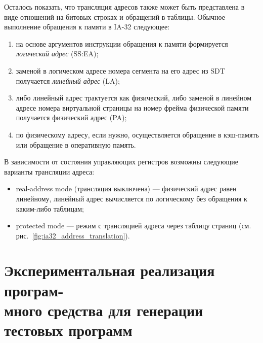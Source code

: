 Осталось показать, что трансляция адресов также может быть представлена в виде
отношений на битовых строках и обращений в таблицы. Обычное выполнение
обращения к памяти в IA-32 следующее:
\begin{enumerate}
    \item на основе аргументов инструкции обращения к памяти формируется \emph{логический адрес} (SS:EA);
    \item заменой в логическом адресе номера сегмента на его адрес из SDT получается \emph{линейный адрес} (LA);
    \item либо линейный адрес трактуется как физический, либо заменой в линейном адресе номера виртуальной страницы на номер фрейма физической памяти получается физический адрес (PA);
    \item по физическому адресу, если нужно, осуществляется обращение в кэш-память или обращение в оперативную память.
\end{enumerate}

В зависимости от состояния управляющих регистров возможны следующие варианты трансляции адреса:
\begin{itemize}
  \item real-address mode (трансляция выключена) --- физический адрес равен линейному, линейный адрес вычисляется по логическому без обращения к каким-либо таблицам;
  \item protected mode --- режим с трансляцией адреса через таблицу страниц (см. рис.~\ref{fig:ia32_address_translation}).
\end{itemize}



\section{Экспериментальная реализация програм-\\много средства для генерации тестовых программ}

